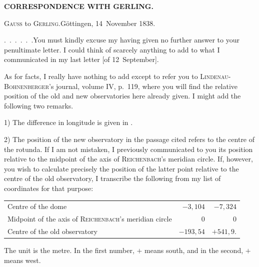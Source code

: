 \par\clearpage
\noindent{}\hfill{\small\textbf{CORRESPONDENCE WITH GERLING.}}\hfill\null\par\medskip
\begin{center}
\textsc{Gauss} to \textsc{Gerling}.\quad Göttingen, 14~November 1838.
\end{center}
\par\noindent\hspace*{\parindent}\mbox{.\ .\ .\ .\ .\ .}\quad You must kindly excuse my having given no further answer to your penultimate letter. I could think of scarcely anything to add to what I communicated in my last letter [of 12~September].
\par\noindent\hspace*{\parindent}As for facts, I really have nothing to add except to refer you to \textsc{Lindenau-Bohnenberger}'s journal, volume IV, p.~119, where you will find the relative position of the old and new observatories here already given. I might add the following two remarks.
\par\noindent\hspace*{\parindent}1) The difference in longitude is given in .
\par\noindent\hspace*{\parindent}2) The position of the new observatory in the passage cited refers to the centre of the rotunda. If I am not mistaken, I previously communicated to you its position relative to the midpoint of the axis of \textsc{Reichenbach}'s meridian circle. If, however, you wish to calculate precisely the position of the latter point relative to the centre of the old observatory, I transcribe the following from my list of coordinates for that purpose:
\begin{center}
\setlength{\tabcolsep}{4pt}
\begin{tabular}{@{}lrr@{}}
Centre of the dome & \(-3{,}104\) & \(-7{,}324\)\\
Midpoint of the axis of \textsc{Reichenbach}'s meridian circle & \(0\) & \(0\)\\
Centre of the old observatory & \(-193{,}54\) & \(+541{,}9\).
\end{tabular}
\end{center}
\par\noindent\hspace*{\parindent}The unit is the metre. In the first number, \(+\) means south, and in the second, \(+\) means west.
